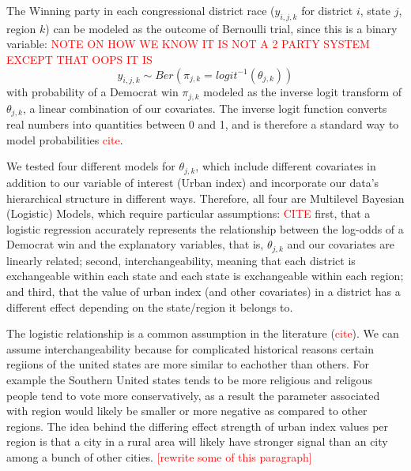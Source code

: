 \documentclass[12pt]{article}
\begin{document}
The Winning party in each congressional district race ($y_{i,j,k}$ for district $i$, state $j$, region $k$) can be modeled as the outcome of Bernoulli trial, since this is a binary variable: \textcolor{red}{NOTE ON HOW WE KNOW IT IS NOT A 2 PARTY SYSTEM EXCEPT THAT OOPS IT IS}
\begin{equation}
	y_{i,j,k} \sim Ber \left( \pi_{j,k} = logit^{-1}(\theta_{j,k})  \right)
\end{equation}
with probability of a Democrat win $\pi_{j,k}$ modeled as the inverse logit transform of $\theta_{j,k}$, a linear combination of our covariates. The inverse logit function converts real numbers into quantities between 0 and 1, and is therefore a standard way to model probabilities \textcolor{red}{cite}.


We tested four different models for $\theta_{j,k}$, which include different covariates in addition to our variable of interest (Urban index) and incorporate our data's hierarchical structure in different ways. Therefore, all four are Multilevel Bayesian (Logistic) Models, which require particular assumptions: \textcolor{red}{CITE} 
first, that a logistic regression accurately represents the relationship between the log-odds of a Democrat win and the explanatory variables, that is, $\theta_{j,k}$ and our covariates are linearly related; second, interchangeability, meaning that each district is exchangeable within each state and each state is exchangeable within each region; and third, that the value of urban index (and other covariates) in a district has a different effect depending on the state/region it belongs to.


The logistic relationship is a common assumption in the literature (\textcolor{red}{cite}).
We can assume interchangeability because for complicated historical reasons certain regiions of the united states are more similar to eachother than others. For example the Southern United states tends to be more religious and religous people tend to vote more conservatively, as a result the parameter associated with region would likely be smaller or more negative as compared to other regions. 
The idea behind the differing effect strength of urban index values per region is that a city in a rural area will likely have stronger signal than an city among a bunch of other cities. \textcolor{red}{[rewrite some of this paragraph]}
\end{document}
